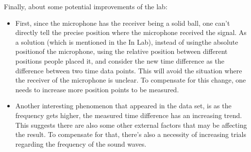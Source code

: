 \documentclass{article}
\begin{document}
Finally, about some potential improvements of the lab:
\begin{itemize}
    \item First, since the microphone has the receiver being a solid ball, one can't directly tell the precise position where the microphone received the signal. As a solution (which is mentioned in the In Lab), instead of usingthe absolute positionof the microphone, using the relative position between different positions people placed it, and consider the new time difference as the difference between two time data points. This will avoid the situation where the receiver of the microphone is unclear. To compensate for this change, one needs to increase more position points to be measured.
    \item Another interesting phenomenon that appeared in the data set, is as the frequency gets higher, the measured time difference has an increasing trend. This suggests there are also some other external factors that may be affecting the result. To compensate for that, there's also a necessity of increasing trials regarding the frequency of the sound waves.
\end{itemize}
\end{document}
